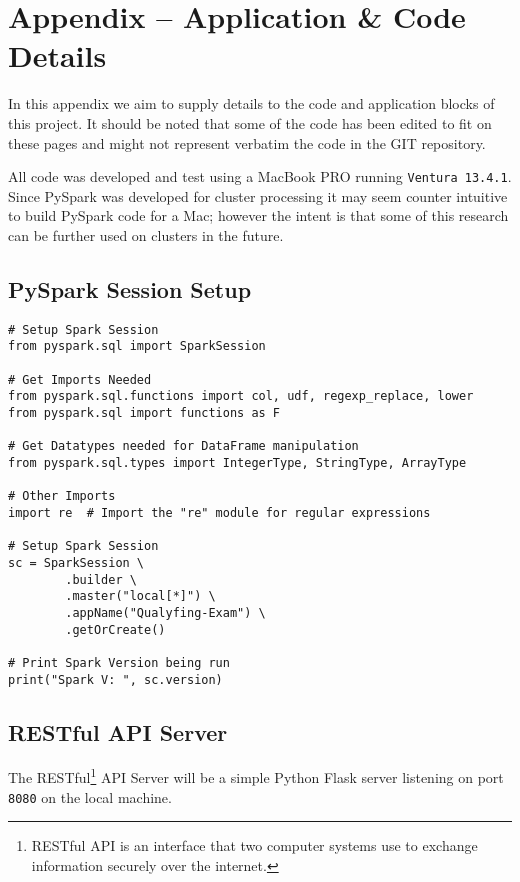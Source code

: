 \section{Appendix -- Application \& Code Details}
In this appendix we aim to supply details to the code and application blocks of this project. It should be noted that some of the code has been edited to fit on these pages and might not represent verbatim the code in the GIT repository.

All code was developed and test using a MacBook PRO running \texttt{Ventura 13.4.1}. Since PySpark was developed for cluster processing it may seem counter intuitive to build PySpark code for a Mac; however the intent is that some of this research can be further used on clusters in the future.

\subsection{PySpark Session Setup}
\label{appendix:py-spark-setup}
\begin{verbatim}
# Setup Spark Session
from pyspark.sql import SparkSession

# Get Imports Needed
from pyspark.sql.functions import col, udf, regexp_replace, lower
from pyspark.sql import functions as F

# Get Datatypes needed for DataFrame manipulation
from pyspark.sql.types import IntegerType, StringType, ArrayType

# Other Imports
import re  # Import the "re" module for regular expressions

# Setup Spark Session
sc = SparkSession \
        .builder \
        .master("local[*]") \
        .appName("Qualyfing-Exam") \
        .getOrCreate()

# Print Spark Version being run
print("Spark V: ", sc.version)
\end{verbatim}
\clearpage

\subsection{RESTful API Server}
\label{appendix:code-api-server}
The RESTful\footnote{RESTful API is an interface that two computer systems use to exchange information securely over the internet.} API Server will be a simple Python Flask server listening on port \texttt{8080} on the local machine.


